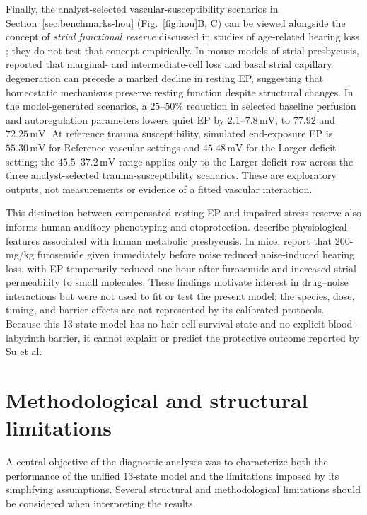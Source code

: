 \documentclass[final,5p,times]{elsarticle}
\begin{document}
Finally, the analyst-selected vascular-susceptibility scenarios in Section~\ref{sec:benchmarks-hou} (Fig.~\ref{fig:hou}B, C) can be viewed alongside the concept of \emph{strial functional reserve} discussed in studies of age-related hearing loss \citep{Ohlemiller2006,Ohlemiller2009}; they do not test that concept empirically. In mouse models of strial presbycusis, \citet{Ohlemiller2006} reported that marginal- and intermediate-cell loss and basal strial capillary degeneration can precede a marked decline in resting EP, suggesting that homeostatic mechanisms preserve resting function despite structural changes. In the model-generated scenarios, a \(25\text{--}50\%\) reduction in selected baseline perfusion and autoregulation parameters lowers quiet EP by \(2.1\text{--}7.8\,\mathrm{mV}\), to \(77.92\) and \(72.25\,\mathrm{mV}\). At reference trauma susceptibility, simulated end-exposure EP is \(55.30\,\mathrm{mV}\) for Reference vascular settings and \(45.48\,\mathrm{mV}\) for the Larger deficit setting; the \(45.5\text{--}37.2\,\mathrm{mV}\) range applies only to the Larger deficit row across the three analyst-selected trauma-susceptibility scenarios. These are exploratory outputs, not measurements or evidence of a fitted vascular interaction.

This distinction between compensated resting EP and impaired stress reserve also informs human auditory phenotyping and otoprotection. \citet{Vaden2022} describe physiological features associated with human metabolic presbycusis. In mice, \citet{Su2026} report that 200-mg/kg furosemide given immediately before noise reduced noise-induced hearing loss, with EP temporarily reduced one hour after furosemide and increased strial permeability to small molecules. These findings motivate interest in drug--noise interactions but were not used to fit or test the present model; the species, dose, timing, and barrier effects are not represented by its calibrated protocols. Because this 13-state model has no hair-cell survival state and no explicit blood--labyrinth barrier, it cannot explain or predict the protective outcome reported by Su et al.

\section{Methodological and structural limitations}\label{sec:limitations}

A central objective of the diagnostic analyses was to characterize both the performance of the unified 13-state model and the limitations imposed by its simplifying assumptions. Several structural and methodological limitations should be considered when interpreting the results.
\end{document}
